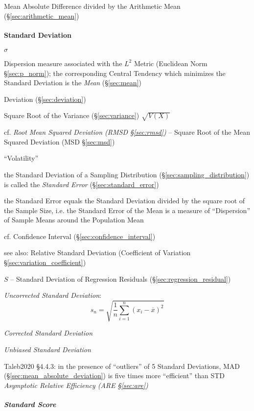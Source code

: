 Mean Absolute Difference divided by the Arithmetic Mean
(\S\ref{sec:arithmetic_mean})



\paragraph{Standard Deviation}\label{sec:standard_deviation}\hfill

$\sigma$

Dispersion measure associated with the $L^2$ Metric (Euclidean Norm
\S\ref{sec:p_norm}); the corresponding Central Tendency which minimizes the
Standard Deviation is the \emph{Mean} (\S\ref{sec:mean})

Deviation (\S\ref{sec:deviation})

Square Root of the Variance (\S\ref{sec:variance}) $\sqrt{V(X)}$

cf. \emph{Root Mean Squared Deviation (RMSD \S\ref{sec:rmsd})} -- Square Root of
the Mean Squared Deviation (MSD \S\ref{sec:msd})

``Volatility''

the Standard Deviation of a Sampling Distribution
(\S\ref{sec:sampling_distribution}) is called the \emph{Standard Error}
(\S\ref{sec:standard_error})

the Standard Error equals the Standard Deviation divided by the square root of
the Sample Size, i.e. the Standard Error of the Mean is a measure of
``Dispersion'' of Sample Means around the Population Mean

cf. Confidence Interval (\S\ref{sec:confidence_interval})

see also: Relative Standard Deviation (Coefficient of Variation
\S\ref{sec:variation_coefficient})

$S$ -- Standard Deviation of Regression Residuals
(\S\ref{sec:regression_residual})

\emph{Uncorrected Standard Deviation}:
\[
  s_n = \sqrt{\frac{1}{n}\sum_{i=1}^n (x_i - \overline{x})^2}
\]

\emph{Corrected Standard Deviation}

\emph{Unbiased Standard Deviation}

Taleb2020 \S 4.4.3: in the presence of ``outliers'' of 5 Standard Deviations,
MAD (\S\ref{sec:mean_absolute_deviation}) is five times more ``efficient'' than
STD \fist \emph{Asymptotic Relative Efficiency (ARE \S\ref{sec:are})}



\subparagraph{Standard Score}\label{sec:standard_score}\hfill

